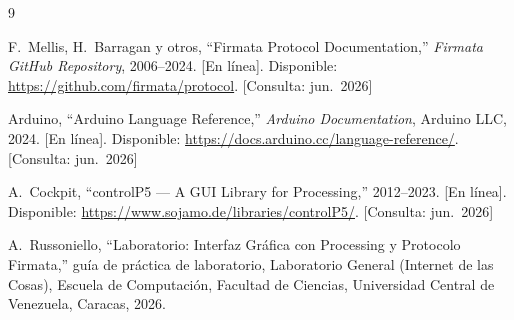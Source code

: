 \clearpage
\begingroup
\small
\begin{thebibliography}{9}

F.~Mellis, H.~Barragan y otros, ``Firmata Protocol Documentation,''
\emph{Firmata GitHub Repository}, 2006--2024.
[En l\'{i}nea]. Disponible: \url{https://github.com/firmata/protocol}.
[Consulta: jun.~2026]

Arduino, ``Arduino Language Reference,'' \emph{Arduino Documentation},
Arduino LLC, 2024. [En l\'{i}nea]. Disponible:
\url{https://docs.arduino.cc/language-reference/}. [Consulta: jun.~2026]

A.~Cockpit, ``controlP5 --- A GUI Library for Processing,'' 2012--2023.
[En l\'{i}nea]. Disponible: \url{https://www.sojamo.de/libraries/controlP5/}.
[Consulta: jun.~2026]

A.~Russoniello, ``Laboratorio: Interfaz Gr\'{a}fica con Processing y Protocolo Firmata,''
gu\'{i}a de pr\'{a}ctica de laboratorio, Laboratorio General (Internet de las Cosas),
Escuela de Computaci\'{o}n, Facultad de Ciencias,
Universidad Central de Venezuela, Caracas, 2026.

\end{thebibliography}
\endgroup


